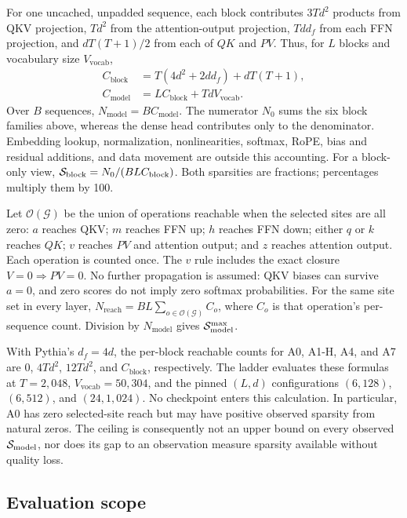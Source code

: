 For one uncached, unpadded sequence, each block contributes $3Td^2$ products
from QKV projection, $Td^2$ from the attention-output projection, $Td d_f$ from
each FFN projection, and $dT(T+1)/2$ from each of $QK$ and $PV$.
Thus, for $L$ blocks and vocabulary size $V_{\!\mathrm{vocab}}$,
\begin{equation}
\begin{split}
C_{\mathrm{block}}&=T(4d^2+2dd_f)+dT(T+1),\\
C_{\mathrm{model}}&=LC_{\mathrm{block}}+TdV_{\!\mathrm{vocab}}.
\end{split}
\label{eq:denominator}
\end{equation}
Over $B$ sequences, $N_{\mathrm{model}}=BC_{\mathrm{model}}$. The numerator
$N_0$ sums the six block families above, whereas the dense head contributes
only to the denominator. Embedding lookup, normalization, nonlinearities,
softmax, RoPE, bias and residual additions, and data movement are outside this
accounting. For a block-only view, $\mathcal{S}_{\mathrm{block}}=N_0/(BLC_{\mathrm{block}})$.
Both sparsities are fractions; percentages multiply them by 100.

Let $\mathcal{O}(\mathcal{G})$ be the union of operations reachable when the
selected sites are all zero: $a$ reaches QKV; $m$ reaches FFN up; $h$ reaches
FFN down; either $q$ or $k$ reaches $QK$; $v$ reaches $PV$ and attention output;
and $z$ reaches attention output. Each operation is counted once.
The $v$ rule includes the exact closure $V=0\Rightarrow PV=0$. No further
propagation is assumed: QKV biases can survive $a=0$, and zero scores do not
imply zero softmax probabilities. For the same site set in every layer,
$N_{\mathrm{reach}}=BL\sum_{o\in\mathcal{O}(\mathcal{G})}C_o$, where $C_o$
is that operation's per-sequence count. Division by $N_{\mathrm{model}}$ gives
$\mathcal{S}_{\mathrm{model}}^{\max}$.

With Pythia's $d_f=4d$, the per-block reachable counts for A0, A1-H, A4, and A7
are $0$, $4Td^2$, $12Td^2$, and $C_{\mathrm{block}}$, respectively. The ladder
evaluates these formulas at $T=2{,}048$, $V_{\!\mathrm{vocab}}=50{,}304$, and
the pinned $(L,d)$ configurations $(6,128)$, $(6,512)$, and $(24,1{,}024)$.
No checkpoint enters this calculation. In particular, A0 has zero selected-site
reach but may have positive observed sparsity from natural zeros. The ceiling
is consequently not an upper bound on every observed $\mathcal{S}_{\mathrm{model}}$, nor does its
gap to an observation measure sparsity available without quality loss.

\subsection{Evaluation scope}
\label{app:evaluation}


